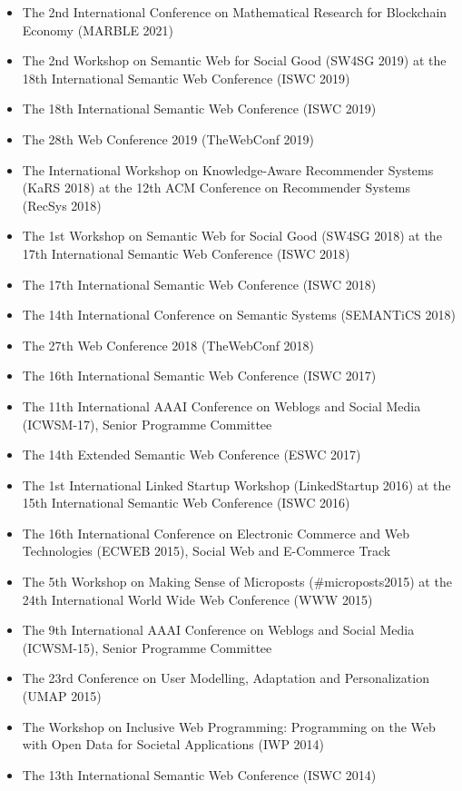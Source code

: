 \documentclass[10pt,a4paper]{res} %
\begin{document}
\begin{resume}
\begin{itemize} \itemsep -2pt
\item The 2nd International Conference on Mathematical Research for Blockchain Economy (MARBLE 2021)
\item The 2nd Workshop on Semantic Web for Social Good (SW4SG 2019) at the 18th International Semantic Web Conference (ISWC 2019)
\item The 18th International Semantic Web Conference (ISWC 2019)
\item The 28th Web Conference 2019 (TheWebConf 2019)
\item The International Workshop on Knowledge-Aware Recommender Systems (KaRS 2018) at the 12th ACM Conference on Recommender Systems (RecSys 2018)
\item The 1st Workshop on Semantic Web for Social Good (SW4SG 2018) at the 17th International Semantic Web Conference (ISWC 2018)
\item The 17th International Semantic Web Conference (ISWC 2018)
\item The 14th International Conference on Semantic Systems (SEMANTiCS 2018)
\item The 27th Web Conference 2018 (TheWebConf 2018)
\item The 16th International Semantic Web Conference (ISWC 2017)
\item The 11th International AAAI Conference on Weblogs and Social Media (ICWSM-17), Senior Programme Committee
\item The 14th Extended Semantic Web Conference (ESWC 2017)
\item The 1st International Linked Startup Workshop (LinkedStartup 2016) at the 15th International Semantic Web Conference (ISWC 2016)
\item The 16th International Conference on Electronic Commerce and Web Technologies (ECWEB 2015), Social Web and E-Commerce Track
\item The 5th Workshop on Making Sense of Microposts (\#microposts2015) at the 24th International World Wide Web Conference (WWW 2015)
\item The 9th International AAAI Conference on Weblogs and Social Media (ICWSM-15), Senior Programme Committee
\item The 23rd Conference on User Modelling, Adaptation and Personalization (UMAP 2015)
\item The Workshop on Inclusive Web Programming: Programming on the Web with Open Data for Societal Applications (IWP 2014)
\item The 13th International Semantic Web Conference (ISWC 2014)

\end{itemize}
\end{resume}
\end{document}
